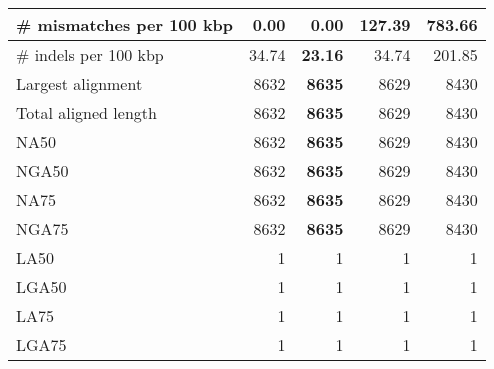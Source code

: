 \documentclass[12pt,a4paper]{article}
\begin{document}
\begin{table}[ht]
\begin{center}
\begin{tabular}{|l*{4}{|r}|}
\# mismatches per 100 kbp & {\bf 0.00} & {\bf 0.00} & 127.39 & 783.66 \\ \hline
\# indels per 100 kbp & 34.74 & {\bf 23.16} & 34.74 & 201.85 \\ \hline
Largest alignment & 8632 & {\bf 8635} & 8629 & 8430 \\ \hline
Total aligned length & 8632 & {\bf 8635} & 8629 & 8430 \\ \hline
NA50 & 8632 & {\bf 8635} & 8629 & 8430 \\ \hline
NGA50 & 8632 & {\bf 8635} & 8629 & 8430 \\ \hline
NA75 & 8632 & {\bf 8635} & 8629 & 8430 \\ \hline
NGA75 & 8632 & {\bf 8635} & 8629 & 8430 \\ \hline
LA50 & 1 & 1 & 1 & 1 \\ \hline
LGA50 & 1 & 1 & 1 & 1 \\ \hline
LA75 & 1 & 1 & 1 & 1 \\ \hline
LGA75 & 1 & 1 & 1 & 1 \\ \hline
\end{tabular}
\end{center}
\end{table}
\end{document}
